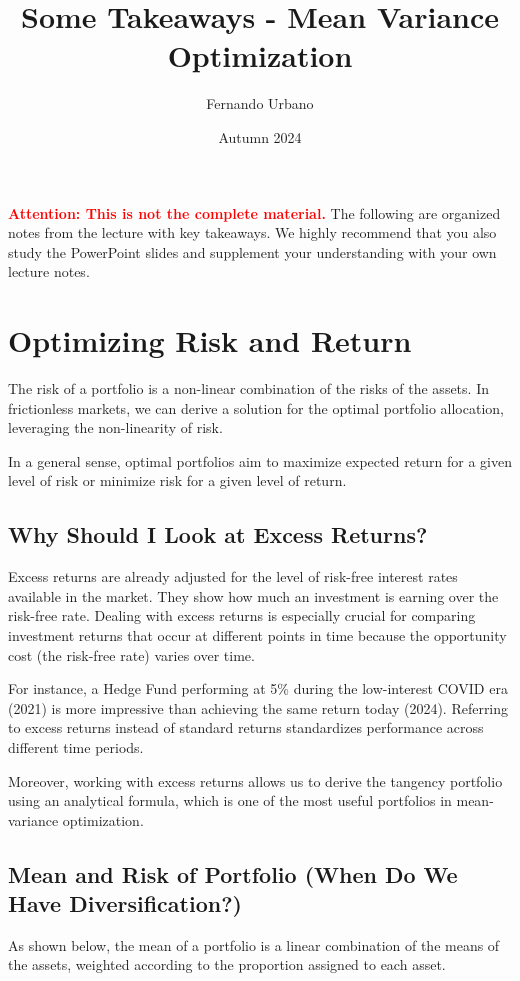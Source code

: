 \documentclass{article}
\title{Some Takeaways - Mean Variance Optimization}
\author{Fernando Urbano}
\date{Autumn 2024}
\newcommand{\redbold}[1]{\textbf{\textcolor{red}{#1}}}
\begin{document}
\maketitle

\redbold{Attention: This is not the complete material.} The following are organized notes from the lecture with key takeaways. We highly recommend that you also study the PowerPoint slides and supplement your understanding with your own lecture notes.

\section{Optimizing Risk and Return}
The risk of a portfolio is a non-linear combination of the risks of the assets. In frictionless markets, we can derive a solution for the optimal portfolio allocation, leveraging the non-linearity of risk.

In a general sense, optimal portfolios aim to maximize expected return for a given level of risk or minimize risk for a given level of return.

\subsection{Why Should I Look at Excess Returns?}
Excess returns are already adjusted for the level of risk-free interest rates available in the market. They show how much an investment is earning over the risk-free rate. Dealing with excess returns is especially crucial for comparing investment returns that occur at different points in time because the opportunity cost (the risk-free rate) varies over time.

For instance, a Hedge Fund performing at 5\% during the low-interest COVID era (2021) is more impressive than achieving the same return today (2024). Referring to excess returns instead of standard returns standardizes performance across different time periods.

Moreover, working with excess returns allows us to derive the tangency portfolio using an analytical formula, which is one of the most useful portfolios in mean-variance optimization.

\subsection{Mean and Risk of Portfolio (When Do We Have Diversification?)}
As shown below, the mean of a portfolio is a linear combination of the means of the assets, weighted according to the proportion assigned to each asset.
\end{document}
